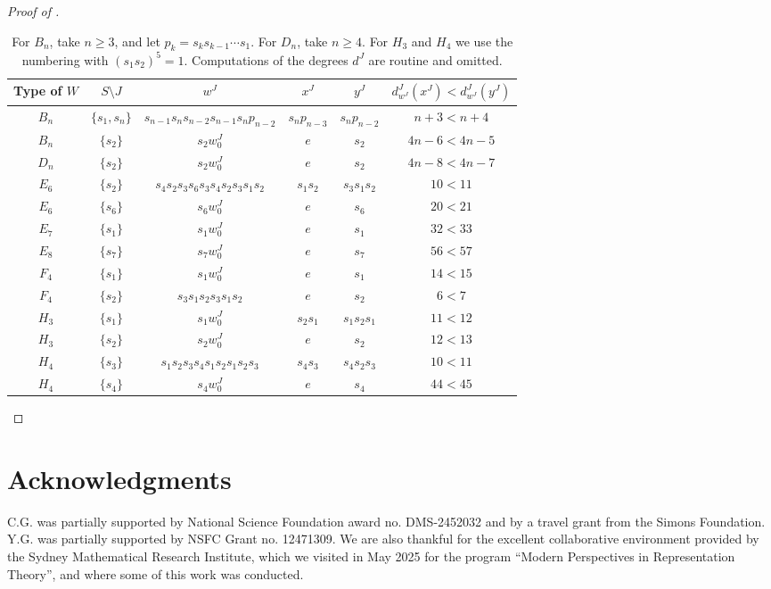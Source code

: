 \documentclass[11pt]{amsart}
\theoremstyle{definition}
\theoremstyle{remark}
\numberwithin{equation}{section}
\begin{document}
\begin{proof}[Proof of ]
\begin{table}[htbp]
\centering
\small
\setlength{\tabcolsep}{3pt}
\renewcommand{\arraystretch}{1.2}
\begin{tabular}{@{}|c|c|c|c|c|c|@{}}
\hline
Type of $W$ & $S\setminus J$ & $w^J$ & $x^J$ & $y^J$
  & $d_{w^J}^J(x^J)<d_{w^J}^J(y^J)$ \\
\hline
$B_n$ & $\{s_1,s_n\}$ & $s_{n-1}s_ns_{n-2}s_{n-1}s_np_{n-2}$
  & $s_np_{n-3}$ & $s_np_{n-2}$ & $n+3<n+4$ \\
$B_n$ & $\{s_2\}$ & $s_2w_0^J$
  & $e$ & $s_2$ & $4n-6<4n-5$ \\
$D_n$ & $\{s_2\}$ & $s_2w_0^J$
  & $e$ & $s_2$ & $4n-8<4n-7$ \\
$E_6$ & $\{s_2\}$ & $s_4s_2s_3s_6s_3s_4s_2s_3s_1s_2$
  & $s_1s_2$ & $s_3s_1s_2$ & $10<11$ \\
$E_6$ & $\{s_6\}$ & $s_6w_0^J$
  & $e$ & $s_6$ & $20<21$ \\
$E_7$ & $\{s_1\}$ & $s_1w_0^J$
  & $e$ & $s_1$ & $32<33$ \\
$E_8$ & $\{s_7\}$ & $s_7w_0^J$
  & $e$ & $s_7$ & $56<57$ \\
$F_4$ & $\{s_1\}$ & $s_1w_0^J$
  & $e$ & $s_1$ & $14<15$ \\
$F_4$ & $\{s_2\}$ & $s_3s_1s_2s_3s_1s_2$
  & $e$ & $s_2$ & $6<7$ \\
$H_3$ & $\{s_1\}$ & $s_1w_0^J$
  & $s_2s_1$ & $s_1s_2s_1$ & $11<12$ \\
$H_3$ & $\{s_2\}$ & $s_2w_0^J$
  & $e$ & $s_2$ & $12<13$ \\
$H_4$ & $\{s_3\}$ & $s_1s_2s_3s_4s_1s_2s_1s_2s_3$
  & $s_4s_3$ & $s_4s_2s_3$ & $10<11$ \\
$H_4$ & $\{s_4\}$ & $s_4w_0^J$
  & $e$ & $s_4$ & $44<45$ \\
\hline
\end{tabular}
\caption{For $B_n$, take $n\geq 3$, and let $p_k=s_ks_{k-1}\cdots s_1$. For $D_n$, take $n\geq 4$.
For $H_3$ and $H_4$ we use the numbering with $(s_1s_2)^5=1$. Computations of the degrees $d^J$ are routine and omitted.}
\label{tab:monotonicity-counterexamples}
\end{table} 
\end{proof}

\section*{Acknowledgments}
C.G. was partially supported by National Science Foundation award no. DMS-2452032 and by a travel grant from the Simons Foundation. Y.G. was partially supported by NSFC Grant no. 12471309. We are also thankful for the excellent collaborative environment provided by the Sydney Mathematical Research Institute, which we visited in May 2025 for the program ``Modern Perspectives in Representation Theory'', and where some of this work was conducted.
\end{document}
